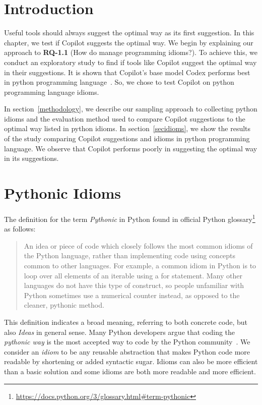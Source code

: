 \label{chapter:idioms}

\section{Introduction}
Useful \cct{} tools should always suggest the optimal way as its first suggestion. In this chapter, we test if Copilot suggests the optimal way. 
We begin by explaining our approach to \textbf{RQ-1.1} (How do \cct{} manage programming idioms?). To achieve this, we conduct an exploratory study to find if \cct{} tools like Copilot suggest the optimal way in their suggestions. It is shown that Copilot's base model Codex performs best in python programming language~\cite{copilot}. So, we chose to test Copilot on python programming language idioms.

In section~\ref{methodology}, we describe our sampling approach to collecting python idioms and the evaluation method used to compare Copilot suggestions to the optimal way listed in python idioms. In section~\ref{secidioms}, we show the results of the study comparing Copilot suggestions and idioms in python programming language. We observe that Copilot performs poorly in suggesting the optimal way in its suggestions. 

\section{Pythonic Idioms}
The definition for the term \emph{Pythonic} in Python found in official Python glossary\footnote{\url{https://docs.python.org/3/glossary.html\#term-pythonic}} as follows:

\begin{quote}
    An idea or piece of code which closely follows the most common idioms of the Python language, rather than implementing code using concepts common to other languages. For example, a common idiom in Python is to loop over all elements of an iterable using a for statement. Many other languages do not have this type of construct, so people unfamiliar with Python sometimes use a numerical counter instead, as opposed to the cleaner, pythonic method.
\end{quote}

This definition indicates a broad meaning, referring to both concrete code, but also \emph{Ideas} in general sense. Many Python developers argue that coding the \emph{pythonic way} is the most accepted way to code by the Python community~\cite{Alexandru2018}. We consider an \emph{idiom} to be any reusable abstraction that makes Python code more readable by shortening or added syntactic sugar. Idioms can also be more efficient than a basic solution and some idioms are both more readable and more efficient.

